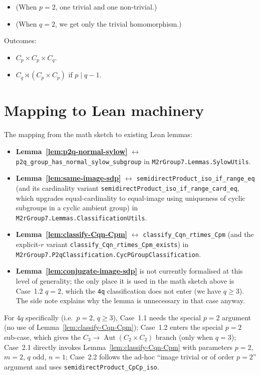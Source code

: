 \begin{itemize}
    \item (When $p = 2$, one trivial and one non-trivial.)
    \item (When $q = 2$, we get only the trivial homomorphism.)
\end{itemize}

Outcomes:
\begin{itemize}
    \item $C_p \times C_p \times C_q$.
    \item $C_q \rtimes (C_p \times C_p)$ if $p \mid q - 1$.
\end{itemize}

\section{Mapping to Lean machinery}

The mapping from the math sketch to existing Lean lemmas:

\begin{itemize}
    \item \textbf{Lemma~\ref{lem:p2q-normal-sylow}} $\leftrightarrow$
        \texttt{p2q\_group\_has\_normal\_sylow\_subgroup} in
        \texttt{M2rGroup7.Lemmas.SylowUtils}.
    \item \textbf{Lemma~\ref{lem:same-image-sdp}} $\leftrightarrow$
        \texttt{semidirectProduct\_iso\_if\_range\_eq} (and its cardinality
        variant \texttt{semidirectProduct\_iso\_if\_range\_card\_eq}, which
        upgrades equal-cardinality to equal-image using uniqueness of cyclic
        subgroups in a cyclic ambient group) in
        \texttt{M2rGroup7.Lemmas.ClassificationUtils}.
    \item \textbf{Lemma~\ref{lem:classify-Cqn-Cpm}} $\leftrightarrow$
        \texttt{classify\_Cqn\_rtimes\_Cpm} (and the explicit-$r$ variant
        \texttt{classify\_Cqn\_rtimes\_Cpm\_exists}) in
        \texttt{M2rGroup7.P2qClassification.CycPGroupClassification}.
    \item \textbf{Lemma~\ref{lem:conjugate-image-sdp}} is not currently
        formalised at this level of generality; the only place it is used in
        the math sketch above is Case~1.2 $q = 2$, which the
        \texttt{4q} classification does not enter (we have $q \geq 3$). The
        side note explains why the lemma is unnecessary in that case anyway.
\end{itemize}

For $4q$ specifically (i.e.\ $p = 2$, $q \geq 3$), Case~1.1 needs the special
$p = 2$ argument (no use of Lemma~\ref{lem:classify-Cqn-Cpm}); Case~1.2 enters
the special $p = 2$ sub-case, which gives the $C_3 \to \operatorname{Aut}(C_2
\times C_2)$ branch (only when $q = 3$); Case~2.1 directly invokes
Lemma~\ref{lem:classify-Cqn-Cpm} with parameters $p = 2$, $m = 2$, $q$ odd,
$n = 1$; Case~2.2 follows the ad-hoc ``image trivial or of order $p = 2$''
argument and uses \texttt{semidirectProduct\_CpCp\_iso}.

